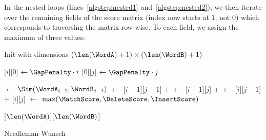 In the nested loops (lines~\ref{algstep:nested1} and~\ref{algstep:nested2}), we then iterate over the remaining fields of the score matrix (index now starts at $1$, not $0$) which corresponds to traversing the matrix row-wise. To each field, we assign the maximum of three values:

\vfill\null
\columnbreak

\begin{algorithm*}
    \DontPrintSemicolon
    
    \newcommand{\ScoreMatrixIdx}[2]{{\ScoreMatrix}[{#1}][{#2}]}

    \KwOut{\Score}
    \Fn{\calcScoreFunc{}}
    {
        Init \ScoreMatrix with dimensions $(\len(\WordA)+1) \times (\len(\WordB)+1)$\;

        \BlankLine

        {
            \ScoreMatrixIdx{$i$}{$0$} $\gets \GapPenalty \cdot i$\;
        }
        {
            \ScoreMatrixIdx{$0$}{$j$} $\gets \GapPenalty \cdot j$
            \label{algstep:init-gap-end}\;
        }

        \BlankLine

        {
            {
                \Cost $\gets$ $\Sim(\WordA_{i-1}, \WordB_{j-1})$\;
                \MatchScore $\gets$ \ScoreMatrixIdx{$i-1$}{$j-1$} + \Cost
                \label{algstep:matchscore}\;
                \DeleteScore $\gets$ \ScoreMatrixIdx{$i-1$}{$j$} + \GapPenalty
                \label{algstep:deletescore}\;
                \InsertScore $\gets$ \ScoreMatrixIdx{$i$}{$j-1$} + \GapPenalty
                \label{algstep:insertscore}\;
                \ScoreMatrixIdx{$i$}{$j$} $\gets$ $\max(\MatchScore, \DeleteScore, \InsertScore)$\;
            }
        }

        \BlankLine

        \Return\! \ScoreMatrixIdx{$\len(\WordA)$}{$\len(\WordB)$}\;
    }
    
    \caption{Needleman-Wunsch}
    \label{alg:needleman-wunsch}
\end{algorithm*}

